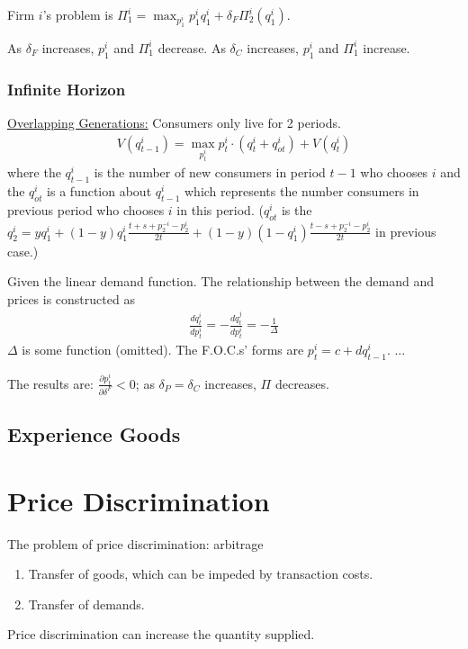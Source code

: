 \documentclass[11pt]{elegantbook}
\begin{document}
Firm $i$'s problem is $\Pi_1^i=\max_{p_1^i} p_1^i q_1^i +\delta_F\Pi_2^i(q_1^i)$.

As $\delta_F$ increases, $p_1^i$ and $\Pi_1^i$ decrease. As $\delta_C$ increases, $p_1^i$ and $\Pi_1^i$ increase.


\subsubsection*{Infinite Horizon}
\underline{Overlapping Generations:}
Consumers only live for 2 periods.
\begin{equation}
    \begin{aligned}
        V(q^i_{t-1})=\max_{p^i_t} p^i_t\cdot (q^i_t+q^i_{ot})+V(q^i_t)
    \end{aligned}
    \nonumber
\end{equation}
where the $q^i_{t-1}$ is the number of new consumers in period $t-1$ who chooses $i$ and the $q^i_{ot}$ is a function about $q^i_{t-1}$ which represents the number consumers in previous period who chooses $i$ in this period. ($q^i_{ot}$ is the $q_2^i=yq_1^i+(1-y)q_1^i\frac{t+s+p_2^{-i}-p_2^i}{2t}+(1-y)(1-q_1^i)\frac{t-s+p_2^{-i}-p_2^i}{2t}$ in previous case.)

Given the linear demand function. The relationship between the demand and prices is constructed as
\begin{equation}
    \begin{aligned}
        \frac{d q^i_t}{d p^i_t}=-\frac{d q^j_t}{d p^i_t}=-\frac{1}{\Delta}
    \end{aligned}
    \nonumber
\end{equation}
$\Delta$ is some function (omitted). The F.O.C.s' forms are $p^i_t=c+d q^i_{t-1}$. ...

The results are: $\frac{\partial p^i_t}{\partial \delta^F}<0$; as $\delta_P=\delta_C$ increases, $\Pi$ decreases.

\subsection{Experience Goods}


\section{Price Discrimination}
The problem of price discrimination: arbitrage
\begin{enumerate}
    \item Transfer of goods, which can be impeded by transaction costs.
    \item Transfer of demands.
\end{enumerate}
Price discrimination can increase the quantity supplied.
\end{document}
